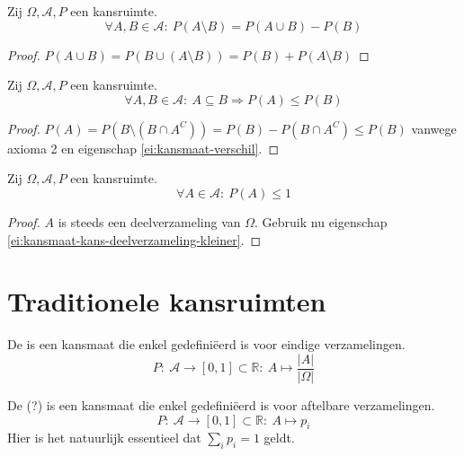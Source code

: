 \documentclass[main.tex]{subfiles}
\begin{document}
\begin{ei}
  \label{ei:kansmaat-verschil}
  Zij $\Omega,\mathcal{A},P$ een kansruimte.
  \[ \forall A,B \in \mathcal{A}:\ P(A \setminus B) = P(A\cup B) - P(B) \]

  \begin{proof}
    $P(A \cup B) = P(B \cup (A\setminus B)) = P(B) + P(A \setminus B)$
  \end{proof}
\end{ei}

\begin{ei}
  \label{ei:kansmaat-kans-deelverzameling-kleiner}
  Zij $\Omega,\mathcal{A},P$ een kansruimte.
  \[ \forall A,B \in \mathcal{A}:\ A \subseteq B \Rightarrow P(A) \le P(B) \]

  \begin{proof}
    $P(A) = P(B \setminus (B \cap A^{C})) = P(B) - P(B \cap A^{C}) \le P(B)$ vanwege axioma 2 en eigenschap \ref{ei:kansmaat-verschil}.
  \end{proof}
\end{ei}

\begin{ei}
  Zij $\Omega,\mathcal{A},P$ een kansruimte.
  \[ \forall A \in \mathcal{A}:\ P(A) \le 1 \]

  \begin{proof}
    $A$ is steeds een deelverzameling van $\Omega$.
    Gebruik nu eigenschap \ref{ei:kansmaat-kans-deelverzameling-kleiner}.
  \end{proof}
\end{ei}


\section{Traditionele kansruimten}
\label{sec:trad-kansr}

\begin{de}
  De  is een kansmaat die enkel gedefini\"eerd is voor eindige verzamelingen.
  \[ P:\ \mathcal{A} \rightarrow [0,1] \subset \mathbb{R}:\ A \mapsto \frac{|A|}{|\Omega|} \]
\end{de}

\begin{de}
  De  (?) is een kansmaat die enkel gedefini\"eerd is voor aftelbare verzamelingen.
  \[ P:\ \mathcal{A} \rightarrow [0,1] \subset \mathbb{R}:\ A \mapsto p_{i} \]
  Hier is het natuurlijk essentieel dat $\sum_{i}p_{i}=1$ geldt. 
\end{de}
\end{document}
